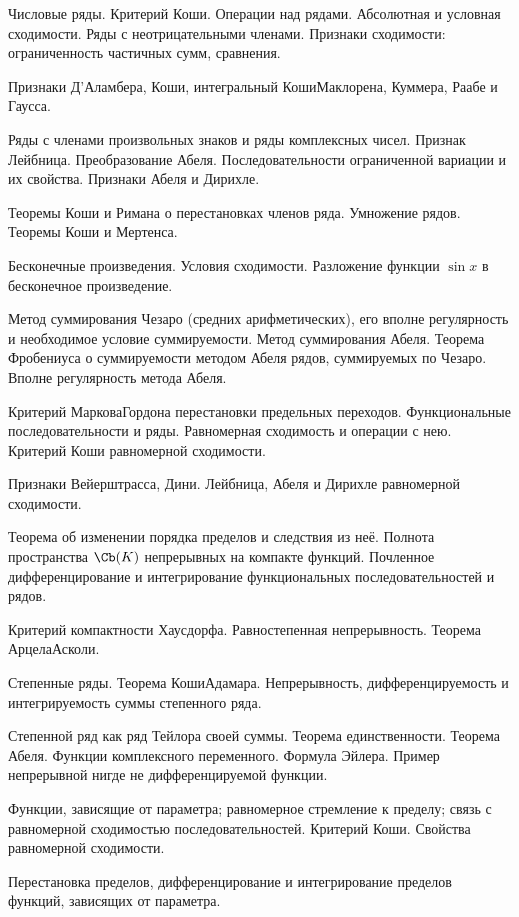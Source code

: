 \documentclass[a4paper]{article}
\begin{document}
\begin{nums}{-4}
\item Числовые ряды. Критерий Коши. Операции над рядами. Абсолютная и условная сходимости.
Ряды с неотрицательными членами. Признаки сходимости: ограниченность частичных сумм, сравнения.
\item Признаки Д'Аламбера, Коши, интегральный Коши\ч Маклорена, Куммера, Раабе и Гаусса.
\item Ряды с членами произвольных знаков и ряды комплексных чисел. Признак Лейбница. Преобразование Абеля.
Последовательности ограниченной вариации и их свойства. Признаки Абеля и Дирихле.
\item Теоремы Коши и Римана о перестановках членов ряда. Умножение рядов. Теоремы Коши и Мертенса.
\item Бесконечные произведения. Условия сходимости. Разложение функции $\sin x$ в бесконечное произведение.
\item Метод суммирования Чезаро (средних арифметических), его вполне регулярность и необходимое условие суммируемости.
Метод суммирования Абеля. Теорема Фробениуса о суммируемости методом Абеля рядов, суммируемых по
Чезаро. Вполне регулярность метода Абеля.
\item Критерий Маркова\ч Гордона перестановки предельных переходов. Функциональные последовательности и ряды.
Равномерная сходимость и операции с нею. Критерий Коши равномерной сходимости.
\item Признаки Вейерштрасса, Дини. Лейбница, Абеля и Дирихле равномерной сходимости.
\item Теорема об изменении порядка пределов и следствия из неё. Полнота пространства $\Cb(K)$ непрерывных на компакте функций.
Почленное дифференцирование и интегрирование функциональных последовательностей и рядов.
\item Критерий компактности Хаусдорфа. Равностепенная непрерывность. Теорема Арцела\ч Асколи.
\item Степенные ряды. Теорема Коши\ч Адамара. Непрерывность, дифференцируемость и интегрируемость суммы степенного ряда.
\item Степенной ряд как ряд Тейлора своей суммы. Теорема единственности. Теорема Абеля. Функции комплексного переменного.
Формула Эйлера. Пример непрерывной нигде не дифференцируемой функции.
\item Функции, зависящие от параметра; равномерное стремление к пределу; связь с равномерной сходимостью последовательностей.
Критерий Коши. Свойства равномерной сходимости.
\item Перестановка пределов, дифференцирование и интегрирование пределов функций, зависящих от параметра.

\end{nums}
\end{document}

